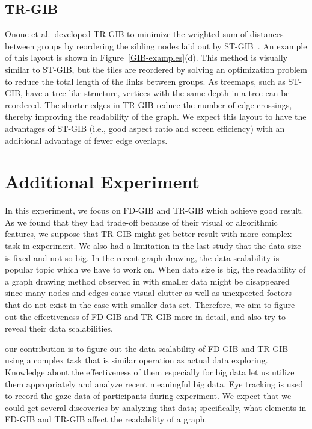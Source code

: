 \documentclass{vgtc}                          %
\begin{document}
\subsection{TR-GIB}
Onoue et al.\ developed TR-GIB to minimize the weighted sum of distances between groups by reordering the sibling nodes laid out by ST-GIB~\cite{onoue2017optimal}.
An example of this layout is shown in Figure~\ref{GIB-examples}(d).
This method is visually similar to ST-GIB, but the tiles are reordered by solving an optimization problem to reduce the total length of the links between groups.
As treemaps, such as ST-GIB, have a tree-like structure, vertices with the same depth in a tree can be reordered.
The shorter edges in TR-GIB reduce the number of edge crossings, thereby improving the readability of the graph.
We expect this layout to have the advantages of ST-GIB (i.e., good aspect ratio and screen efficiency) with an additional advantage of fewer edge overlaps.

\section{Additional Experiment}
In this experiment, we focus on FD-GIB and TR-GIB which achieve good result.
As we found that they had trade-off because of their visual or algorithmic features, we suppose that TR-GIB might get better result with more complex task in experiment.
We also had a limitation in the last study that the data size is fixed and not so big.
In the recent graph drawing, the data scalability is popular topic which we have to work on.
When data size is big, the readability of a graph drawing method observed in with smaller data might be disappeared since many nodes and edges cause visual clutter as well as unexpected foctors that do not exist in the case with smaller data set.
Therefore, we aim to figure out the effectiveness of FD-GIB and TR-GIB more in detail, and also try to reveal their data scalabilities.

our contribution is to figure out the data scalability of FD-GIB and TR-GIB using a complex task that is similar operation as actual data exploring.
Knowledge about the effectiveness of them especially for big data let us utilize them appropriately and analyze recent meaningful big data.
Eye tracking is used to record the gaze data of participants during experiment.
We expect that we could get several discoveries by analyzing that data; specifically, what elements in FD-GIB and TR-GIB affect the readability of a graph.
\end{document}
